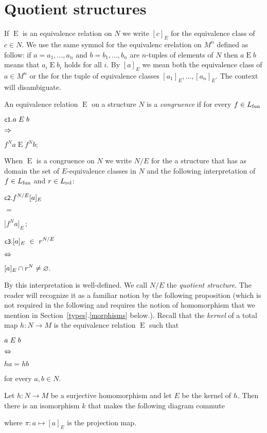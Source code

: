 \documentclass[creche.tex]{subfiles}
\begin{document}
\section{Quotient structures}\label{quotient}
\def\ceq#1#2#3{\parbox[b]{20ex}{$\displaystyle #1$}\parbox[b]{6ex}{\hfil$#2$}$\displaystyle #3$}


If $\mathrel{E}$ is an equivalence relation on $N$ we write \emph{$[c]_E$\/} for the equivalence class of $c\in N$. We use the same symnol for the equivalenc erelation on $M^n$ defined as follow: if $a=a_1,\dots,a_n$ and $b=b_1,\dots,b_n$ are $n$-tuples of elements of $N$ then \emph{$a\mathrel{E} b$\/} means that  $a_i\mathrel{E} b_i$ holds for all $i$. By \emph{$[a]_E$\/} we mean both the equivalence class of $a\in M^n$ or the for the tuple of equivalence classes $[a_1]_E,\dots,[a_n]_E$. The context will disambiguate.

An equivalence relation $\mathrel{E}$ on a structure $N$ is a \emph{congruence\/} if for every $f\in L_{\rm fun}$

\ceq{\ssf{c1}.\hfill a\mathrel{E} b}{\IMP}{f^N a\mathrel{E} f^N b;}

When $\mathrel{E}$ is a congruence on $N$ we write \emph{$N/E$\/} for the a structure that has as domain the set of $E$-equivalence classes in $N$ and the following interpretation of $f\in L_{\rm fun}$ and $r\in L_{\rm rel}$:

\ceq{\ssf{c2.}\hfill f^{N/E}[a]_E}{=}{\big[f^N a\big]_E\,;}

\ceq{\ssf{c3.}\hfill [a]_E\ \in\ r^{N/E}}{\IFF}{[a]_E\cap r^{N}\neq\0.}

By  this interpretation is well-defined. We call $N/E$ the \emph{quotient structure}. The reader will recognize it as a familiar notion by the following proposition (which is not required in the following and requires the notion of homomorphism that we mention in Section~\ref{types}.\ref{morphisms} below.). Recall that the \emph{kernel\/} of a total map $h:N\to M$ is the equivalence relation $\mathrel{E}$ such that

\ceq{\hfill a\mathrel{E} b}{\IFF}{ha=hb} 

for every $a,b\in N$.

\begin{proposition}
Let $h:N\to M$ be a surjective homomorphism and let $E$ be the kernel of $h$. Then there is an isomorphism $k$ that makes the following diagram commute


\hspace*{25ex}

where $\pi:a\mapsto [a]_E$ is the projection map.\QED
\end{proposition}
\end{document}

